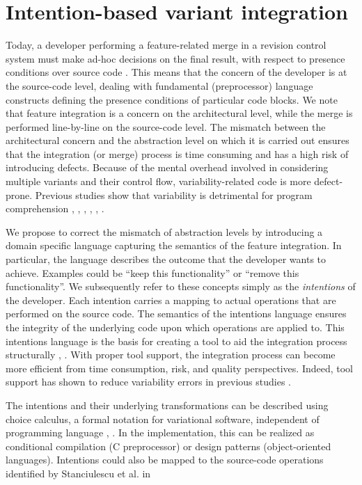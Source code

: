\section{Intention-based variant integration}
Today, a developer performing a feature-related merge in a revision control system must make ad-hoc decisions on the final result, with respect to presence conditions over source code \cite{stanciulescu2016concepts}. This means that the concern of the developer is at the source-code level, dealing with fundamental (preprocessor) language constructs defining the presence conditions of particular code blocks. We note that feature integration is a concern on the architectural level, while the merge is performed line-by-line on the source-code level. The mismatch between the architectural concern and the abstraction level on which it is carried out ensures that the integration (or merge) process is time consuming and has a high risk of introducing defects. Because of the mental overhead involved in considering multiple variants and their control flow, variability-related code is more defect-prone. Previous studies show that variability is detrimental for program comprehension \cite{melo2016latin}, \cite{favre1997understanding}, \cite{ernst2002preprocessor}, \cite{abal2014variability}, \cite{medeiros2015preprocessor}, \cite{medeiros2013syntaxerrors}.

We propose to correct the mismatch of abstraction levels by introducing a domain specific language capturing the semantics of the feature integration. In particular, the language describes the outcome that the developer wants to achieve. Examples could be ``keep this functionality'' or ``remove this functionality''. We subsequently refer to these concepts simply as the \textit{intentions} of the developer. Each intention carries a mapping to actual operations that are performed on the source code. The semantics of the intentions language ensures the integrity of the underlying code upon which operations are applied to. This intentions language is the basis for creating a tool to aid the integration process structurally \cite{mens2002}, \cite{apel2011}. With proper tool support, the integration process can become more efficient from time consumption, risk, and quality perspectives. Indeed, tool support has shown to reduce variability errors in previous studies \cite{ribeiro2014emergent}.

The intentions and their underlying transformations can be described using choice calculus, a formal notation for variational software, independent of programming language \cite{erwig2011choice}, \cite{walkingshaw2012choice}. In the implementation, this can be realized as conditional compilation (C preprocessor) or design patterns (object-oriented languages). Intentions could also be mapped to the source-code operations identified by Stanciulescu et al. in \cite{stanciulescu2016concepts}

